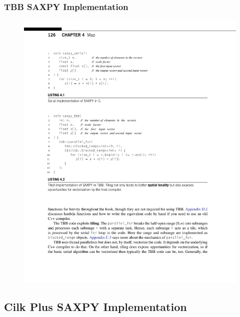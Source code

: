 \documentclass[xcolor=dvipsnames]{beamer}
\begin{document}
		\begin{frame} \frametitle{TBB SAXPY Implementation}
			\begin{figure}
				\centering
				\includegraphics[width=115mm]{images/listing-4-2.pdf}
			\end{figure}
		\end{frame}
		
	\subsection{Cilk Plus SAXPY Implementation}
	
\end{document}
